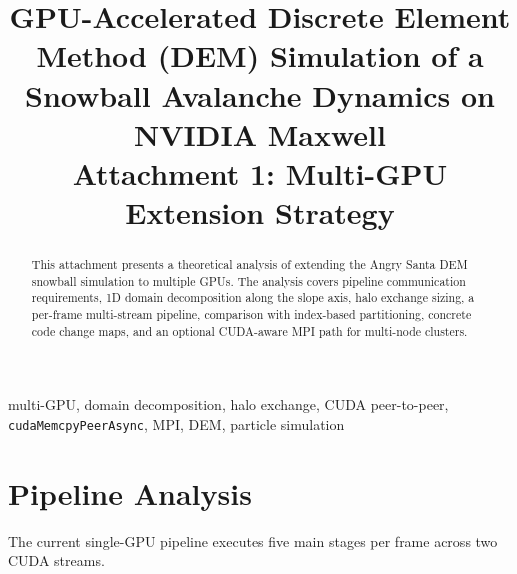 \documentclass[conference]{IEEEtran}
\begin{document}
\title{GPU-Accelerated Discrete Element Method (DEM) Simulation of a Snowball Avalanche Dynamics on NVIDIA Maxwell\\[0.5em]
\LARGE Attachment 1: Multi-GPU Extension Strategy}

\author{
}

\maketitle

\begin{abstract}
This attachment presents a theoretical analysis of extending the Angry Santa
DEM snowball simulation to multiple GPUs. The analysis covers pipeline communication 
requirements, 1D domain decomposition along the slope axis, halo exchange sizing, 
a per-frame multi-stream pipeline, comparison with index-based partitioning, 
concrete code change maps, and an optional CUDA-aware MPI path for multi-node clusters.
\end{abstract}

\begin{IEEEkeywords}
multi-GPU, domain decomposition, halo exchange, CUDA peer-to-peer,
\texttt{cudaMemcpyPeerAsync}, MPI, DEM, particle simulation
\end{IEEEkeywords}

\section{Pipeline Analysis}
\label{sec:pipeline}

The current single-GPU pipeline executes five main stages per frame across
two CUDA streams. 
\end{document}
